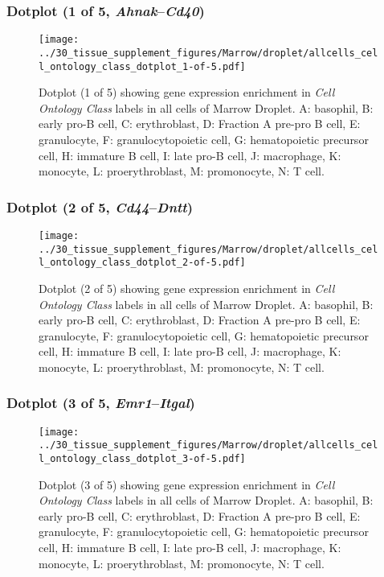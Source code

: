 \clearpage

\subsubsection{Dotplot (1 of 5, \emph{Ahnak}--\emph{Cd40})}
\begin{figure}[h]
\centering
\texttt{[image: ../30\_tissue\_supplement\_figures/Marrow/droplet/allcells\_cell\_ontology\_class\_dotplot\_1-of-5.pdf]}

\caption{ Dotplot (1 of 5)  showing gene expression enrichment in \emph{Cell Ontology Class} labels in all cells of Marrow Droplet. A: basophil, B: early pro-B cell, C: erythroblast, D: Fraction A pre-pro B cell, E: granulocyte, F: granulocytopoietic cell, G: hematopoietic precursor cell, H: immature B cell, I: late pro-B cell, J: macrophage, K: monocyte, L: proerythroblast, M: promonocyte, N: T cell.}
\end{figure}


\clearpage

\subsubsection{Dotplot (2 of 5, \emph{Cd44}--\emph{Dntt})}
\begin{figure}[h]
\centering
\texttt{[image: ../30\_tissue\_supplement\_figures/Marrow/droplet/allcells\_cell\_ontology\_class\_dotplot\_2-of-5.pdf]}

\caption{ Dotplot (2 of 5)  showing gene expression enrichment in \emph{Cell Ontology Class} labels in all cells of Marrow Droplet. A: basophil, B: early pro-B cell, C: erythroblast, D: Fraction A pre-pro B cell, E: granulocyte, F: granulocytopoietic cell, G: hematopoietic precursor cell, H: immature B cell, I: late pro-B cell, J: macrophage, K: monocyte, L: proerythroblast, M: promonocyte, N: T cell.}
\end{figure}


\clearpage

\subsubsection{Dotplot (3 of 5, \emph{Emr1}--\emph{Itgal})}
\begin{figure}[h]
\centering
\texttt{[image: ../30\_tissue\_supplement\_figures/Marrow/droplet/allcells\_cell\_ontology\_class\_dotplot\_3-of-5.pdf]}

\caption{ Dotplot (3 of 5)  showing gene expression enrichment in \emph{Cell Ontology Class} labels in all cells of Marrow Droplet. A: basophil, B: early pro-B cell, C: erythroblast, D: Fraction A pre-pro B cell, E: granulocyte, F: granulocytopoietic cell, G: hematopoietic precursor cell, H: immature B cell, I: late pro-B cell, J: macrophage, K: monocyte, L: proerythroblast, M: promonocyte, N: T cell.}
\end{figure}


